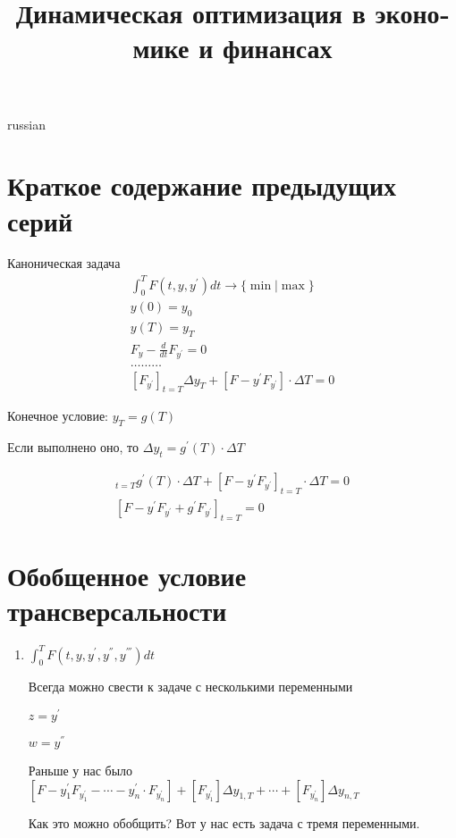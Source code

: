 \documentclass{article}
\begin{document}
\title{\foreignlanguage{russian}{Динамическая оптимизация в экономике и финансах}}
\maketitle

\begin{otherlanguage*}{russian}
\section{\foreignlanguage{russian}{Краткое содержание предыдущих серий}}
Каноническая задача 
\begin{align*}
\int_0^T F(t, y, y^{'}) dt \rightarrow \{ \min | \max \} \\
y(0) = y_0 \\
y(T) = y_T \\ 
F_y - \frac{d}{dt} F_{y^{'}} = 0 \\
\ldots \ldots \ldots \\
[F_{y^{'}}]_{t=T} \Delta y_T + [F - y^{'} F_{y^{'}}] \cdot \Delta T = 0 
\end{align*}

Конечное условие: $ y_T = g(T) $

Если выполнено оно, то $ \Delta y_t = g^{'} (T) \cdot \Delta T$

\begin{align*}
[F_{y^{'}}]_{t=T} g^{'} (T) \cdot \Delta T + [F - y^{'} F_{y^{'}}]_{t=T} \cdot \Delta T = 0 \\
[F - y^{'} F_{y^{'}} + g^{'} F_{y^{'}}]_{t=T} = 0
\end{align*}
\section{\foreignlanguage{russian}{Обобщенное условие трансверсальности}}
\begin{enumerate}
\item $ \int_0^T F(t, y, y^{'}, y^{''}, y^{'''} ) dt$

Всегда можно свести к задаче с несколькими переменными

$ z = y^{'} $ 

$ w = y^{''} $ 

Раньше у нас было $ [F - y_1^{'} F_{y_1^{'}} - \cdots - y_n^{'} \cdot F_{y_n^{'}} ] + [F_{y_1^{'}}] \Delta y_{1, T} + \cdots + [F_{y_n^{'}}] \Delta y_{n, T}  $

Как это можно обобщить? Вот у нас есть задача с тремя переменными. 


\end{enumerate}
\end{otherlanguage*}
\end{document}
